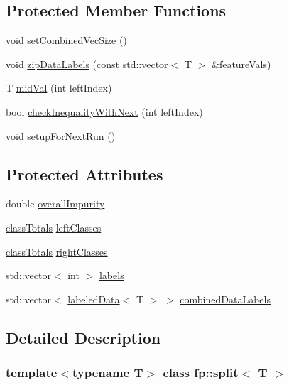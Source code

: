 \subsection*{Protected Member Functions}
\begin{DoxyCompactItemize}
\item 
void \hyperlink{classfp_1_1split_a9c1560ae01a536ed0245d667ee7d5fb6}{set\+Combined\+Vec\+Size} ()
\item 
void \hyperlink{classfp_1_1split_a8fc67880c45fe8a9f7ab8d0cc860597f}{zip\+Data\+Labels} (const std\+::vector$<$ T $>$ \&feature\+Vals)
\item 
T \hyperlink{classfp_1_1split_a0a8bc35b7ff78cb96332cdbda12b5fe5}{mid\+Val} (int left\+Index)
\item 
bool \hyperlink{classfp_1_1split_ac75c6034210f3c53ff3435e2d12377e1}{check\+Inequality\+With\+Next} (int left\+Index)
\item 
void \hyperlink{classfp_1_1split_a5ccfceb36e8ea567816af95bb4ae4fea}{setup\+For\+Next\+Run} ()
\end{DoxyCompactItemize}
\subsection*{Protected Attributes}
\begin{DoxyCompactItemize}
\item 
double \hyperlink{classfp_1_1split_a1eba74d8afed2852da3eb004afe76bb7}{overall\+Impurity}
\item 
\hyperlink{classfp_1_1classTotals}{class\+Totals} \hyperlink{classfp_1_1split_a3be6dcf32281715e6376e9f5f8da18f0}{left\+Classes}
\item 
\hyperlink{classfp_1_1classTotals}{class\+Totals} \hyperlink{classfp_1_1split_af5366297f7de9b8ff0911186300bab7e}{right\+Classes}
\item 
std\+::vector$<$ int $>$ \hyperlink{classfp_1_1split_a9658b163c2cd30e9900e21c3b1c3f2f9}{labels}
\item 
std\+::vector$<$ \hyperlink{classfp_1_1labeledData}{labeled\+Data}$<$ T $>$ $>$ \hyperlink{classfp_1_1split_ac8f54cf4a42335814e10e351c49e3c32}{combined\+Data\+Labels}
\end{DoxyCompactItemize}


\subsection{Detailed Description}
\subsubsection*{template$<$typename T$>$\newline
class fp\+::split$<$ T $>$}



